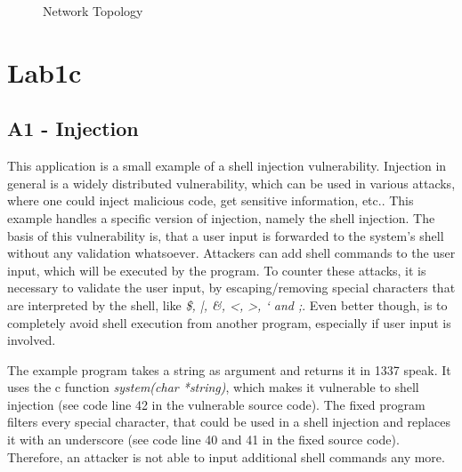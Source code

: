 \documentclass[12pt,a4paper,titlepage,oneside]{scrartcl}
\begin{document}
\begin{figure}[h!]
  \centering
  \caption{Network Topology}
\end{figure}

\section{Lab1c}

\subsection{A1 - Injection}
This application is a small example of a shell injection vulnerability. Injection in general is a widely distributed vulnerability, which can be used
in various attacks, where one could inject malicious code, get sensitive information, etc.. This example handles a specific version of injection, namely the shell injection. The basis of this vulnerability is, that a user input is forwarded to the system's shell without any validation whatsoever. Attackers can add shell commands to the user input, which will be executed by the program. To counter these attacks, it is necessary to validate the user input, by escaping/removing special characters that are interpreted by the shell, like  \textit{\$, |, \&, <, >, ` and ;}. Even better though, is to completely avoid shell execution from another program, especially if user input is involved.

The example program takes a string as argument and returns it in 1337 speak. It uses the c function
\textit{system(char *string)}, which makes it vulnerable to shell injection (see code line 42 in the vulnerable source code). The fixed program filters
every special character, that could be used in a shell injection and replaces it with an
underscore (see code line 40 and 41 in the fixed source code). Therefore, an attacker is not able to input additional shell commands any more.
\end{document}
